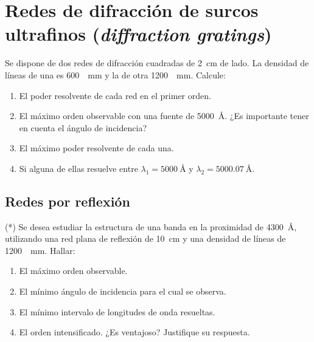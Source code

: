 \section*{Redes de difracción de surcos ultrafinos (\emph{diffraction gratings})}


\item Se dispone de dos redes de difracción cuadradas de \SI{2}{\centi\metre} de lado.
La densidad de líneas de una es \SI{600}{\per\milli\metre} y la de otra \SI{1200}{\per\milli\metre}.
Calcule: 
\begin{enumerate}
	\item El poder resolvente de cada red en el primer orden. 
	\item El máximo orden observable con una fuente de \SI{5000}{\angstrom}. 
	¿Es importante tener en cuenta el ángulo de incidencia? 
	\item El máximo poder resolvente de cada una. 
	\item Si alguna de ellas resuelve entre $\lambda_1 = \SI{5000}{\angstrom}$ y $\lambda_2 = \SI{5000,07}{\angstrom}$.
\end{enumerate}


\subsection*{Redes por reflexión}

\item (*) Se desea estudiar la estructura de una banda en la proximidad de \SI{4300}{\angstrom}, utilizando una red plana de reflexión de \SI{10}{\centi\metre} y una densidad de líneas de \SI{1200}{\per\milli\metre}.
Hallar:
\begin{enumerate}
	\item El máximo orden observable. 
	\item El mínimo ángulo de incidencia para el cual se observa. 
	\item El mínimo intervalo de longitudes de onda resueltas. 
	\item El orden intensificado.
	¿Es ventajoso?
	Justifique su respuesta. 
\end{enumerate}
